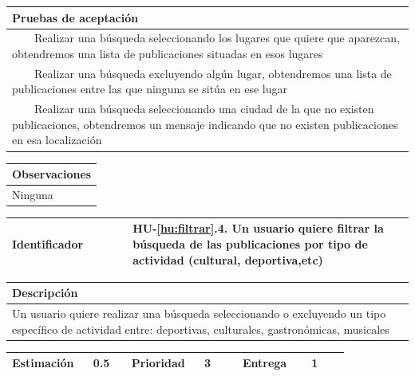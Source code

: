 \documentclass[11pt]{article}
\newcommand{\tabitem}{~~\llap{\textbullet}~~}
\begin{document}
\begin{longtable}{p{1.028\linewidth}}
	\textbf{Pruebas de aceptación}\\
	\midrule
	\tabitem Realizar una búsqueda seleccionando los lugares que quiere que aparezcan, obtendremos una lista de publicaciones situadas en esos lugares\\
	\tabitem Realizar una búsqueda excluyendo algún lugar, obtendremos una lista de publicaciones entre las que ninguna se sitúa en ese lugar\\
	\tabitem Realizar una búsqueda seleccionando una ciudad de la que no existen publicaciones, obtendremos un mensaje indicando que no existen publicaciones en esa localización\\
\end{longtable}
\begin{longtable}{p{1.028\linewidth}}
	\textbf{Observaciones}\\
	\midrule
	Ninguna\\
	\bottomrule
	\bottomrule
\end{longtable}

\centering
\begin{longtable}{p{0.3\linewidth}|p{0.7\linewidth}}
	\toprule
	\toprule
	\textbf{Identificador} & \textbf{HU-\ref{hu:filtrar}.4}. Un usuario quiere filtrar la búsqueda de las publicaciones por tipo de actividad (cultural, deportiva,etc)\\
	
	\bottomrule
\end{longtable}

\begin{longtable}{p{1.028\linewidth}}
	\textbf{Descripción}\\
	\midrule
	 Un usuario quiere realizar una búsqueda seleccionando o excluyendo un tipo específico de actividad entre: deportivas, culturales, gastronómicas, musicales\\
\end{longtable}
\begin{longtable}{p{0.18\linewidth}|p{0.1\linewidth}|p{0.18\linewidth}|p{0.1\linewidth}|p{0.18\linewidth}|p{0.1\linewidth}}
	\toprule
	\textbf{Estimación} & 0.5 & \textbf{Prioridad} & 3 & \textbf{Entrega} & 1 \\
	\bottomrule
\end{longtable}
\end{document}
